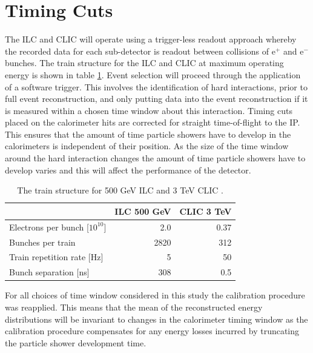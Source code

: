\section{Timing Cuts}
The ILC and CLIC will operate using a trigger-less readout approach whereby the recorded data for each sub-detector is readout between collisions of $\text{e}^{+}$ and $\text{e}^{-}$ bunches.  The train structure for the ILC and CLIC at maximum operating energy is shown in table \ref{table:trainstructure}.  Event selection will proceed through the application of a software trigger.  This involves the identification of hard interactions, prior to full event reconstruction, and only putting data into the event reconstruction if it is measured within a chosen time window about this interaction.  Timing cuts placed on the calorimeter hits are corrected for straight time-of-flight to the IP.  This ensures that the amount of time particle showers have to develop in the calorimeters is independent of their position.  As the size of the time window around the hard interaction changes the amount of time particle showers have to develop varies and this will affect the performance of the detector.  

\begin{table}[h!]
\centering
\begin{tabular}{l r r}
\hline
& ILC 500 GeV & CLIC 3 TeV \\
\hline
Electrons per bunch [$10^{10}$] & 2.0 & 0.37 \\
Bunches per train & 2820 & 312 \\
Train repetition rate [Hz] & 5 & 50 \\
Bunch separation [ns] & 308 & 0.5 \\
\end{tabular}
\caption[The train structure for 500 GeV ILC and 3 TeV CLIC \cite{Behnke:2013lya,Linssen:2012hp}.]{The train structure for 500 GeV ILC and 3 TeV CLIC \cite{Behnke:2013lya,Linssen:2012hp}.}
\label{table:trainstructure}
\end{table}

For all choices of time window considered in this study the calibration procedure was reapplied.  This means that the mean of the reconstructed energy distributions will be invariant to changes in the calorimeter timing window as the calibration procedure compensates for any energy losses incurred by truncating the particle shower development time.  


